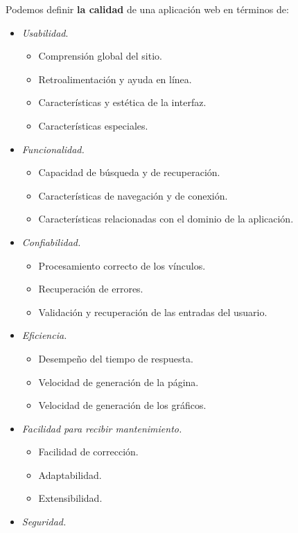 \documentclass[a4paper,oneside,11pt]{book}
\begin{document}
		\bigskip
		\bigskip
		Podemos definir \textbf{la calidad} de una aplicación web en términos de:
		\begin{itemize}
			\item \textit{Usabilidad}.
				\begin{itemize}
					\item Comprensión global del sitio.
					\item Retroalimentación y ayuda en línea.
					\item Características y estética de la interfaz.
					\item Características especiales.
				\end{itemize}
			\item \textit{Funcionalidad.}
				\begin{itemize}
					\item Capacidad de búsqueda y de recuperación.
					\item Características de navegación y de conexión.
					\item Características relacionadas con el dominio de la aplicación.
				\end{itemize}
			\item \textit{Confiabilidad.}
				\begin{itemize}
					\item Procesamiento correcto de los vínculos.
					\item Recuperación de errores.
					\item Validación y recuperación de las entradas del usuario.
				\end{itemize}
			\item \textit{Eficiencia.}
				\begin{itemize}
					\item Desempeño del tiempo de respuesta.
					\item Velocidad de generación de la página.
					\item Velocidad de generación de los gráficos.
				\end{itemize}
			\item \textit{Facilidad para recibir mantenimiento.}
				\begin{itemize}
					\item Facilidad de corrección.
					\item Adaptabilidad.
					\item Extensibilidad.
				\end{itemize}
			\item \textit{Seguridad.}
				\begin{itemize}

\end{itemize}
\end{itemize}
\end{document}
